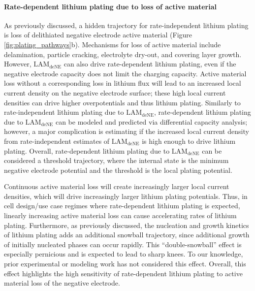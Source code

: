 \documentclass[journal=jpclcd,manuscript=article]{achemso}
\begin{document}
\paragraph{Rate-dependent lithium plating due to loss of active material}
As previously discussed, a hidden trajectory for rate-independent lithium plating is loss of delithiated negative electrode active material (Figure \ref{fig:plating_pathways}b).\cite{ansean_operando_2017, dubarry_durability_2018, baure_synthetic_2019, dubarry_big_2020} Mechanisms for loss of active material include delamination, particle cracking, electrolyte dry-out, and covering layer growth. However, $\mathrm{LAM_{deNE}}$ can also drive rate-dependent lithium plating, even if the negative electrode capacity does not limit the charging capacity. Active material loss without a corresponding loss in lithium flux will lead to an increased local current density on the negative electrode surface; these high local current densities can drive higher overpotentials and thus lithium plating.
Similarly to rate-independent lithium plating due to $\mathrm{LAM_{deNE}}$, rate-dependent lithium plating due to $\mathrm{LAM_{deNE}}$ can be modeled and predicted via differential capacity analysis;
however, a major complication is estimating if the increased local current density from rate-independent estimates of $\mathrm{LAM_{deNE}}$ is high enough to drive lithium plating.
Overall, rate-dependent lithium plating due to $\mathrm{LAM_{deNE}}$ can be considered a threshold trajectory, where the internal state is the minimum negative electrode potential and the threshold is the local plating potential.

Continuous active material loss will create increasingly larger local current densities, which will drive increasingly larger lithium plating potentials. Thus, in cell design/use case regimes where rate-dependent lithium plating is expected, linearly increasing active material loss can cause accelerating rates of lithium plating.
Furthermore, as previously discussed, the nucleation and growth kinetics of lithium plating adds an additional snowball trajectory, since additional growth of initially nucleated phases can occur rapidly. This ``double-snowball'' effect is especially pernicious and is expected to lead to sharp knees. To our knowledge, prior experimental or modeling work has not considered this effect. Overall, this effect highlights the high sensitivity of rate-dependent lithium plating to active material loss of the negative electrode.
\end{document}
